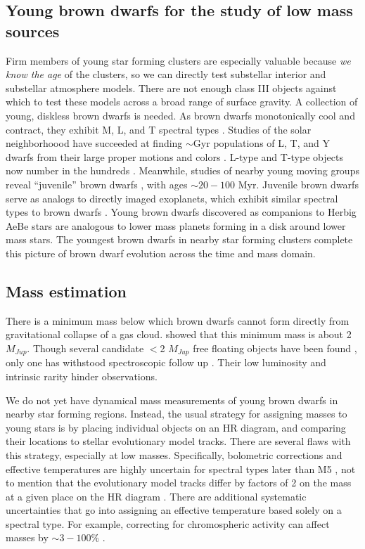 \subsection{Young brown dwarfs for the study of low mass sources}
Firm members of young star forming clusters are especially valuable because \emph{we know the age} of the clusters, so we can directly test substellar interior and substellar atmosphere models.  There are not enough class III objects against which to test these models across a broad range of surface gravity.  A collection of young, diskless brown dwarfs is needed.  As brown dwarfs monotonically cool and contract, they exhibit M, L, and T spectral types \citep{2012ApJS..201...19D}.  Studies of the solar neighborhoood have succeeded at finding $\sim$Gyr populations of L, T, and Y dwarfs from their large proper motions and colors \citep{2011ApJS..197...19K}.  L-type and T-type objects now number in the hundreds \citep{2010AJ....139.1808S,2011ApJS..197...19K}.  Meanwhile, studies of nearby young moving groups reveal ``juvenile'' brown dwarfs \citep{2013ApJ...772...79A}, with ages $\sim20-100$ Myr.  Juvenile brown dwarfs serve as analogs to directly imaged exoplanets, which exhibit similar spectral types to brown dwarfs \citep{2015ApJ...798L...3C}.  Young brown dwarfs discovered as companions to Herbig AeBe stars are analogous to lower mass planets forming in a disk around lower mass stars.  The youngest brown dwarfs in nearby star forming clusters complete this picture of brown dwarf evolution across the time and mass domain.

\subsection{Mass estimation}

There is a minimum mass below which brown dwarfs cannot form directly from gravitational collapse of a gas cloud.  \citet{1976MNRAS.176..483R} showed that this minimum mass is about 2 $M_{Jup}$.  Though several candidate $<$2 $M_{Jup}$ free floating objects have been found \citep{2015A&A...574A.118P}, only one has withstood spectroscopic follow up \citep{2010ApJ...709L.158M}.  Their low luminosity and intrinsic rarity hinder observations.

We do not yet have dynamical mass measurements of young brown dwarfs in nearby star forming regions.  Instead, the usual strategy for assigning masses to young stars is by placing individual objects on an HR diagram, and comparing their locations to stellar evolutionary model tracks.  There are several flaws with this strategy, especially at low masses.  Specifically, bolometric corrections and effective temperatures are highly uncertain for spectral types later than M5 \citep{2013ApJS..208....9P}, not to mention that the evolutionary model tracks differ by factors of 2 on the mass at a given place on the HR diagram \citep{1994ApJS...90..467D,1998A&A...337..403B}.  There are additional systematic uncertainties that go into assigning an effective temperature based solely on a spectral type.  For example, correcting for chromospheric activity can affect masses by $\sim3-100\%$ \citep{2014ApJ...796..119S}.

